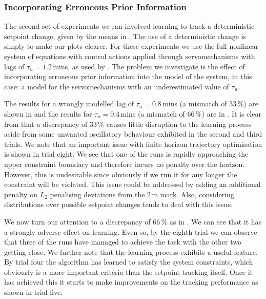 


\subsubsection{Incorporating Erroneous Prior Information}

The second set of experiments we ran involved learning to track a deterministic setpoint change, given by the means in . The use of a deterministic change is simply to make our plots clearer. For these experiments we use the full nonlinear system of equations with control actions applied through servomechanisms with lags of $\tau_u=1.2\,$mins, as used by \cite{Mac02}. The problem we investigate is the effect of incorporating erroneous prior information into the model of the system, in this case: a model for the servomechanisms with an underestimated value of $\tau_u$. 


The results for a wrongly modelled lag of $\tau_u=0.8\,$mins (a mismatch of 33$\,$\%) are shown in  and the results for $\tau_u=0.4\,$mins (a mismatch of 66$\,$\%) are in . It is clear from  that a discrepancy of 33$\,$\% causes little disruption to the learning process aside from some unwanted oscillatory behaviour exhibited in the second and third trials. We note that an important issue with finite horizon trajectory optimisation is shown in trial eight. We see that one of the runs is rapidly approaching the upper constraint boundary and therefore incurs no penalty over the horizon. However, this is undesirable since obviously if we run it for any longer the constraint will be violated. This issue could be addressed by adding an additional penalty on $L_2$ penalising deviations from the 2$\,$m mark. Also, considering distributions over possible setpoint changes tends to deal with this issue.

We now turn our attention to a discrepancy of 66$\,$\% as in . We can see that it has a strongly adverse effect on learning. Even so, by the eighth trial we can observe that three of the runs have managed to achieve the task with the other two getting close.
%
We further note that the learning process exhibits a useful feature. By trial four the algorithm has learned to satisfy the system constraints, which obviously is a more important criteria than the setpoint tracking itself. Once it has achieved this it starts to make improvements on the tracking performance as shown in trial five.








